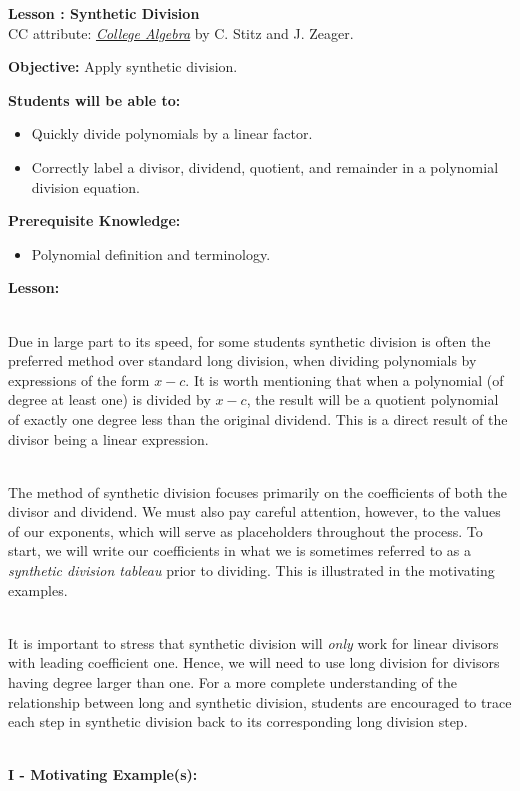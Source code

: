 \documentclass[12pt]{article}
\theoremstyle{definition}
\begin{document}
{\bf \large Lesson : Synthetic Division}\label{les:synthetic_division}
\\ CC attribute: \href{http://www.stitz-zeager.com}{\it{College Algebra}} by C. Stitz and J. Zeager. 
\hfill \doclicenseImage[imagewidth=5em]\\
\par
{\bf Objective:} Apply synthetic division.\\
\par
{\bf Students will be able to:}
\begin{itemize}
	\item Quickly divide polynomials by a linear factor.
	\item Correctly label a divisor, dividend, quotient, and remainder in a polynomial division equation.
\end{itemize}
{\bf Prerequisite Knowledge:}
\begin{itemize}
	\item Polynomial definition and terminology.
\end{itemize}
\hrulefill

{\bf Lesson:}\\
\ \par
Due in large part to its speed, for some students synthetic division is often the preferred method over standard long division, when dividing polynomials by expressions of the form $x-c$.  It is worth mentioning that when a polynomial (of degree at least one) is divided by $x-c$, the result will be a quotient polynomial of exactly one degree less than the original dividend.  This is a direct result of the divisor being a linear expression.\\
\ \par
The method of synthetic division focuses primarily on the coefficients of both the divisor and dividend.  We must also pay careful attention, however, to the values of our exponents, which will serve as placeholders throughout the process.  To start, we will write our coefficients in what we is sometimes referred to as a {\it synthetic division tableau} prior to dividing.  This is illustrated in the motivating examples.\\
\ \par
It is important to stress that synthetic division will {\it only} work for linear divisors with leading coefficient one.  Hence, we will need to use long division for divisors having degree larger than one.  For a more complete understanding of the relationship between long and synthetic division, students are encouraged to trace each step in synthetic division back to its corresponding long division step.\\
\ \par
{\bf I - Motivating Example(s):}\\
\ \par
\end{document}
